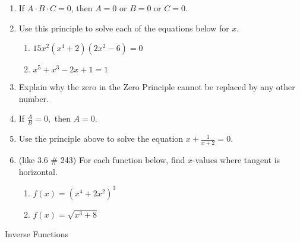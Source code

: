 \documentclass[11pt,fleqn]{article}
\begin{document}
 \begin{enumerate}
 \item {} If $A \cdot B \cdot C = 0$, then $A=0$ or $B = 0$ or $C=0.$
 \item Use this principle to solve each of the equations below for $x.$
 	\begin{enumerate}
 	\item $15x^2(x^4+2)(2x^2-6)=0$
	\vfill
	\item $x^5+x^3-2x+1=1$
	\vfill
	\end{enumerate}
\item Explain why the zero in the Zero Principle cannot be replaced by any other number. 
\vfill
\item {} If $\frac{A}{B}=0,$ then $A=0.$
\item Use the principle above to solve the equation $x+\frac{1}{x+2}=0.$
\vfill
\item (like 3.6 \# 243) For each function below, find $x$-values where tangent is horizontal.
	\begin{enumerate}
	\item $f(x)=(x^4+2x^2)^3$
	\vfill
	\item $f(x)=\sqrt{x^3+8}$
	\vfill
	\end{enumerate}
 \end{enumerate}
 \newpage
 \begin{center} Inverse Functions \end{center}
\end{document}
